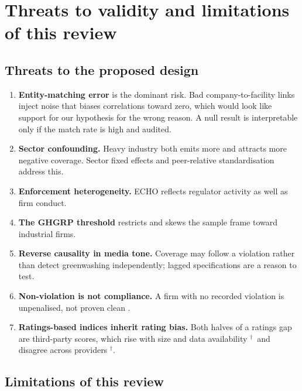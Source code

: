 \documentclass[12pt,a4paper]{article}
\newcommand{\dg}{$^{\dagger}$}          %
\newcommand{\lab}[1]{\textbf{#1}}
\begin{document}
\section{Threats to validity and limitations of this review}
\label{sec:threats}

\subsection{Threats to the proposed design}

\begin{enumerate}
\item \lab{Entity-matching error} is the dominant risk. Bad company-to-facility links inject noise
  that biases correlations toward zero, which would look like support for our hypothesis for the
  wrong reason. A null result is interpretable only if the match rate is high and audited.
\item \lab{Sector confounding.} Heavy industry both emits more and attracts more negative coverage.
  Sector fixed effects and peer-relative standardisation address this.
\item \lab{Enforcement heterogeneity.} ECHO reflects regulator activity as well as firm conduct.
\item \lab{The GHGRP threshold} restricts and skews the sample frame toward industrial firms.
\item \lab{Reverse causality in media tone.} Coverage may follow a violation rather than detect
  greenwashing independently; lagged specifications are a reason to test.
\item \lab{Non-violation is not compliance.} A firm with no recorded violation is unpenalised, not
  proven clean \citep{gorovaia2025}.
\item \lab{Ratings-based indices inherit rating bias.} Both halves of a ratings gap are third-party
  scores, which rise with size and data availability \citep{drempetic2020}\dg\ and disagree across
  providers \citep{gibsonbrandon2021}\dg.
\end{enumerate}

\subsection{Limitations of this review}
\end{document}
